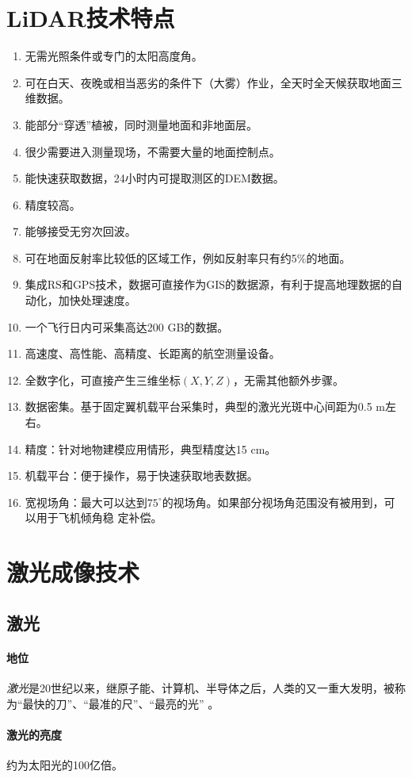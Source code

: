 \section{LiDAR技术特点}
\begin{enumerate}
	\item 无需光照条件或专门的太阳高度角。
	\item 可在白天、夜晚或相当恶劣的条件下（大雾）作业，全天时全天候获取地面三维数据。
	\item 能部分“穿透”植被，同时测量地面和非地面层。
	\item 很少需要进入测量现场，不需要大量的地面控制点。
	\item 能快速获取数据，24小时内可提取测区的DEM数据。
	\item 精度较高。
	\item 能够接受无穷次回波。
	\item 可在地面反射率比较低的区域工作，例如反射率只有约5\%的地面。
	\item 集成RS和GPS技术，数据可直接作为GIS的数据源，有利于提高地理数据的自动化，加快处理速度。
	\item 一个飞行日内可采集高达200 GB的数据。
	\item 高速度、高性能、高精度、长距离的航空测量设备。
	\item 全数字化，可直接产生三维坐标$ (X,Y,Z) $，无需其他额外步骤。
	\item 数据密集。基于固定翼机载平台采集时，典型的激光光斑中心间距为0.5 m左右。
	\item 精度：针对地物建模应用情形，典型精度达15 cm。
	\item 机载平台：便于操作，易于快速获取地表数据。
	\item 宽视场角：最大可以达到$ 75^{\circ} $的视场角。如果部分视场角范围没有被用到，可以用于飞机倾角稳
	定补偿。
\end{enumerate}

\section{激光成像技术}
\subsection{激光}
\paragraph{地位}\textit{激光}是20世纪以来，继原子能、计算机、半导体之后，人类的又一重大发明，被称为“最快的刀”、“最准的尺”、“最亮的光” 。
\paragraph{激光的亮度}约为太阳光的100亿倍。
